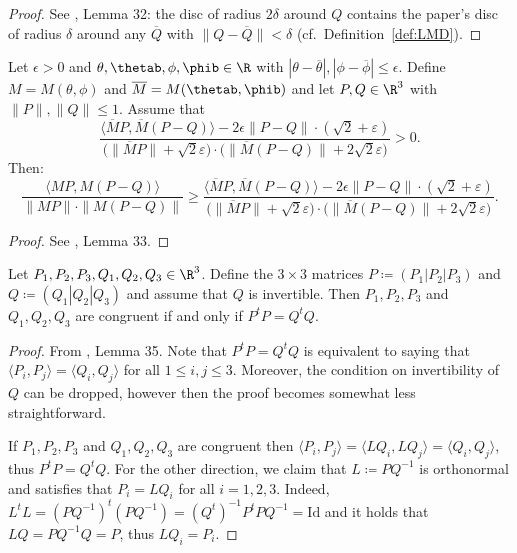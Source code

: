 \begin{proof}\leanok
See \cite{polyhedron.without.rupert}, Lemma 32: the disc of radius $2\delta$ around $Q$ contains the paper's disc of radius $\delta$ around any $\overline{Q}$ with $\|Q - \overline{Q}\| < \delta$ (cf.\ Definition~\ref{def:LMD}).
\end{proof}

\begin{lemma} \label{lem:coss}
  \leanok
  Let $\epsilon>0$ and $\theta,\thetab, \phi, \phib \in \R$ with $|\theta - \overline{\theta}|, |\phi - \overline{\phi}| \leq \epsilon$. Define $M = M(\theta, \phi)$ and $\overline{M} = M(\thetab, \phib)$ and let $P, Q \in \R^3$ with $\|P\|, \|Q\| \leq 1$. Assume that
    \[
        \frac{\langle \overline{M} P,\overline{M} (P-Q)\rangle - 2 \epsilon \|P-Q\| \cdot  (\sqrt{2}+\varepsilon)}{ \big(\|\overline{M} P\|+\sqrt{2} \varepsilon \big) \cdot \big(\|\overline{M}(P-Q)\|+2 \sqrt{2} \varepsilon\big)} > 0.
    \]
  Then:
    \[
        \frac{\langle {M} P,{M} (P-Q)\rangle}{\|{M} P\| \cdot \|{M}(P-Q)\|} \geq
        \frac{\langle \overline{M} P,\overline{M} (P-Q)\rangle - 2 \epsilon \|P-Q\| \cdot  (\sqrt{2}+\varepsilon)}{ \big(\|\overline{M} P\|+\sqrt{2} \varepsilon \big) \cdot \big(\|\overline{M}(P-Q)\|+2 \sqrt{2} \varepsilon\big)}.
    \]
\end{lemma}
\begin{proof}
\leanok
See \cite{polyhedron.without.rupert}, Lemma 33.
\end{proof}

\begin{lemma} \label{lem:congruent}
\leanok
{}
    Let $P_1,P_2,P_3, Q_1,Q_2,Q_3 \in \R^3$. Define the $3 \times 3$ matrices $P \coloneqq (P_1|P_2|P_3)$ and $Q \coloneqq (Q_1|Q_2|Q_3)$ and assume that $Q$ is invertible.
    Then $P_1, P_2, P_3$ and $Q_1, Q_2, Q_3$ are congruent if and only if $P^t P = Q^t Q$.
\end{lemma}

\begin{proof}
\leanok
From \cite{polyhedron.without.rupert}, Lemma 35.
Note that $P^t P = Q^t Q$ is equivalent to saying that $\langle P_i,P_j\rangle = \langle Q_i,Q_j\rangle$ for all $1 \leq i,j \leq 3$. Moreover, the condition on invertibility of $Q$ can be dropped, however then the proof becomes somewhat less straightforward.

    If $P_1, P_2, P_3$ and $Q_1, Q_2, Q_3$ are congruent then $\langle P_i,P_j\rangle = \langle LQ_i,LQ_j\rangle = \langle Q_i,Q_j\rangle$, thus $P^t P = Q^t Q$.
    For the other direction, we claim that $L \coloneqq PQ^{-1}$ is orthonormal and satisfies that $P_i = LQ_i$ for all $i=1,2,3$.
    Indeed,  $L^t L = (PQ^{-1})^t (PQ^{-1}) = (Q^t)^{-1} P^t P Q^{-1} = \mathrm{Id}$ and it holds that $LQ=PQ^{-1}Q=P$, thus $LQ_i = P_i$.
\end{proof}


